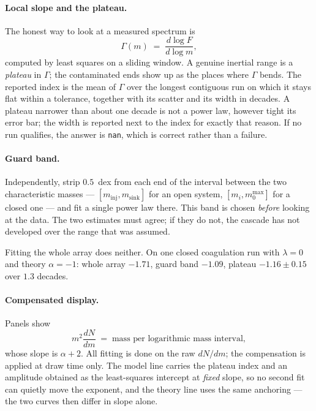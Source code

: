 \documentclass[a4paper,12pt]{article}
\newcommand{\minj}{m_{\mathrm{inj}}}
\newcommand{\msink}{m_{\mathrm{sink}}}
\newcommand{\code}[1]{\texttt{#1}}
\begin{document}
\paragraph{Local slope and the plateau.} The honest way to look at a measured
spectrum is
\begin{equation}
  \Gamma(m) \;=\; \frac{d\log F}{d\log m},
\end{equation}
computed by least squares on a sliding window. A genuine inertial range is a
\emph{plateau} in $\Gamma$; the contaminated ends show up as the places where
$\Gamma$ bends. The reported index is the mean of $\Gamma$ over the longest
contiguous run on which it stays flat within a tolerance, together with its
scatter and its width in decades. A plateau narrower than about one decade is
not a power law, however tight its error bar; the width is reported next to
the index for exactly that reason. If no run qualifies, the answer is
\code{nan}, which is correct rather than a failure.

\paragraph{Guard band.} Independently, strip $0.5$~dex from each end of the
interval between the two characteristic masses --- $[\minj,\msink]$ for an
open system, $[m_i, m_0^{\max}]$ for a closed one --- and fit a single power
law there. This band is chosen \emph{before} looking at the data. The two
estimates must agree; if they do not, the cascade has not developed over the
range that was assumed.

Fitting the whole array does neither. On one closed coagulation run with
$\lambda=0$ and theory $\alpha=-1$: whole array $-1.71$, guard band $-1.09$,
plateau $-1.16 \pm 0.15$ over $1.3$ decades.

\paragraph{Compensated display.} Panels show
\begin{equation}
  m^2 \frac{dN}{dm} \;=\; \text{mass per logarithmic mass interval},
\end{equation}
whose slope is $\alpha+2$. All fitting is done on the raw $dN/dm$; the
compensation is applied at draw time only. The model line carries the plateau
index and an amplitude obtained as the least-squares intercept at
\emph{fixed} slope, so no second fit can quietly move the exponent, and the
theory line uses the same anchoring --- the two curves then differ in slope
alone.
\end{document}
